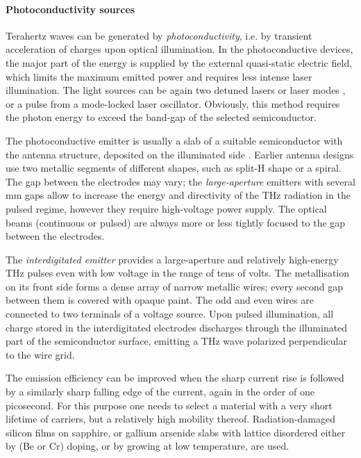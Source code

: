 \paragraph{Photoconductivity sources}%
Terahertz waves can be generated by \textit{photoconductivity}, i.e. by transient acceleration of charges upon optical illumination.
In the photoconductive devices, the major part of the energy is supplied by the external quasi-static electric field, which limits the maximum emitted power and requires less intense laser illumination. The light sources can be again two detuned lasers or laser modes \cite{gu1999generation}, or a pulse from a mode-locked laser oscillator. Obviously, this method requires the photon energy to exceed the band-gap of the selected semiconductor.

The photoconductive emitter is usually a slab of a suitable semiconductor with the antenna structure, deposited on the illuminated side \cite{auston1984picosecond}. Earlier antenna designs use two metallic segments of different shapes, such as split-H shape or a spiral. The gap between the electrodes may vary; the \textit{large-aperture} emitters with several mm gaps %
allow to increase the energy and directivity of the THz radiation in the pulsed regime, however they require high-voltage power supply.
The optical beams (continuous or pulsed) are always more or less tightly focused to the gap between the electrodes. 

The \textit{interdigitated emitter} \cite{darrow1990subpicosecond,hu1990optically} 
provides a large-aperture and relatively high-energy THz pulses even with low voltage in the range of tens of volts. The metallisation on its front side forms a dense array of narrow metallic wires; every second gap between them is covered with opaque paint. The odd and even wires are connected to two terminals of a voltage source.  Upon pulsed illumination, all charge stored in the interdigitated electrodes discharges through the illuminated part of the semiconductor surface, emitting a THz wave polarized perpendicular to the wire grid.

The emission efficiency can be improved when the sharp current rise is followed by a similarly sharp falling edge of the current, again in the order of one picosecond. For this purpose one needs to select a material with a very short lifetime of carriers, but a relatively high mobility thereof. Radiation-damaged silicon films on sapphire, or gallium arsenide slabs with lattice disordered either by (Be or Cr) doping, or by growing at low temperature, are used. 

